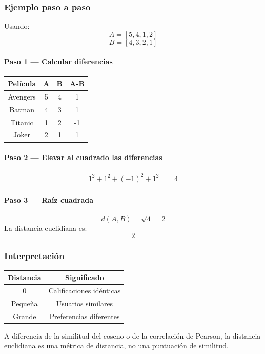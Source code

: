 \documentclass[12pt]{article}
\begin{document}
\subsubsection*{Ejemplo paso a paso}
Usando:
\[
A=[5,4,1,2]
\]
\[
B=[4,3,2,1]
\]

\paragraph{Paso 1 --- Calcular diferencias}
\begin{center}
\begin{tabular}{|c|c|c|c|}
\hline
Película & A & B & A-B \\
\hline
Avengers & 5 & 4 & 1 \\
Batman & 4 & 3 & 1 \\
Titanic & 1 & 2 & -1 \\
Joker & 2 & 1 & 1 \\
\hline
\end{tabular}
\end{center}

\paragraph{Paso 2 --- Elevar al cuadrado las diferencias}
\begin{align*}
1^2 + 1^2 + (-1)^2 + 1^2 &= 4
\end{align*}

\paragraph{Paso 3 --- Raíz cuadrada}
\[
d(A,B)=\sqrt{4}=2
\]
La distancia euclidiana es:
\[
2
\]

\subsubsection*{Interpretación}
\begin{center}
\begin{tabular}{|c|c|}
\hline
Distancia & Significado \\
\hline
0 & Calificaciones idénticas \\
Pequeña & Usuarios similares \\
Grande & Preferencias diferentes \\
\hline
\end{tabular}
\end{center}

A diferencia de la similitud del coseno o de la correlación de Pearson, la distancia euclidiana es una métrica de distancia, no una puntuación de similitud.
\end{document}
